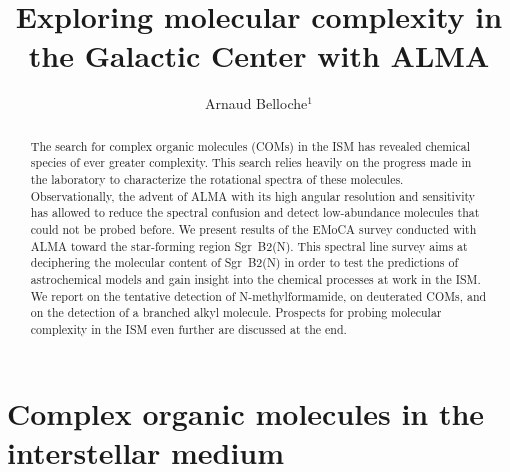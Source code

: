 \documentclass{iau}
\title[Exploring molecular complexity in the Galactic Center with ALMA] %
{Exploring molecular complexity in the Galactic Center with ALMA}
\author[Arnaud Belloche]   %
{Arnaud Belloche$^1$}
\affiliation{$^1$Max-Planck-Institut f\"ur Radioastronomie, Auf dem H\"ugel 69, 53121 Bonn, Germany
\\ email: {\tt belloche@mpifr-bonn.mpg.de}}
\begin{document}
\maketitle

\begin{abstract}
The search for complex organic molecules (COMs) in the ISM has revealed 
chemical species of ever greater complexity. This search relies heavily on the 
progress made in the laboratory to characterize the rotational spectra of 
these molecules. Observationally, the advent of ALMA with its high angular 
resolution and sensitivity has allowed to reduce the spectral confusion and 
detect low-abundance molecules that could not be probed before. We present 
results of the EMoCA survey conducted with ALMA toward the star-forming region 
Sgr~B2(N). 
This spectral line survey aims at deciphering the molecular content of 
Sgr~B2(N) in order to test the predictions of astrochemical models and gain 
insight into the chemical processes at work in the ISM. We report on the 
tentative detection of N-methylformamide, on deuterated COMs, and on the 
detection of a branched alkyl molecule. Prospects for probing molecular 
complexity in the ISM even further are discussed at the end.

\end{abstract}

\firstsection %
\section{Complex organic molecules in the interstellar medium}
\label{s:intro}
\end{document}
